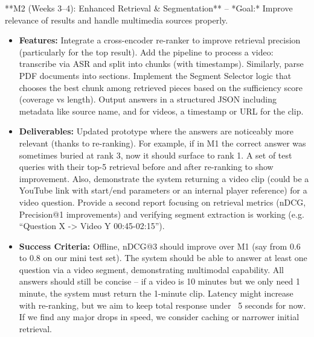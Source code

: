 \documentclass[11pt]{article}
\begin{document}
**M2 (Weeks 3–4): Enhanced Retrieval \& Segmentation** – *Goal:* Improve relevance of results and handle multimedia sources properly.
  \begin{itemize}
    \item \textbf{Features:} Integrate a cross-encoder re-ranker to improve retrieval precision (particularly for the top result). Add the pipeline to process a video: transcribe via ASR and split into chunks (with timestamps). Similarly, parse PDF documents into sections. Implement the Segment Selector logic that chooses the best chunk among retrieved pieces based on the sufficiency score (coverage vs length). Output answers in a structured JSON including metadata like source name, and for videos, a timestamp or URL for the clip.
    \item \textbf{Deliverables:} Updated prototype where the answers are noticeably more relevant (thanks to re-ranking). For example, if in M1 the correct answer was sometimes buried at rank 3, now it should surface to rank 1. A set of test queries with their top-5 retrieval before and after re-ranking to show improvement. Also, demonstrate the system returning a video clip (could be a YouTube link with start/end parameters or an internal player reference) for a video question. Provide a second report focusing on retrieval metrics (nDCG, Precision@1 improvements) and verifying segment extraction is working (e.g. “Question X -> Video Y 00:45-02:15”).
    \item \textbf{Success Criteria:} Offline, nDCG@3 should improve over M1 (say from 0.6 to 0.8 on our mini test set). The system should be able to answer at least one question via a video segment, demonstrating multimodal capability. All answers should still be concise – if a video is 10 minutes but we only need 1 minute, the system must return the 1-minute clip. Latency might increase with re-ranking, but we aim to keep total response under ~5 seconds for now. If we find any major drops in speed, we consider caching or narrower initial retrieval.
  \end{itemize}
\end{document}
